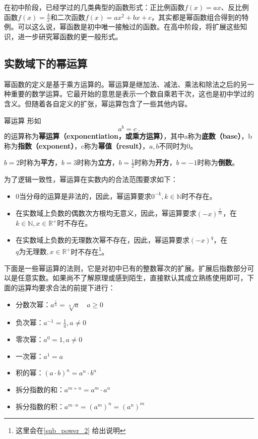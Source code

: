 


在初中阶段，已经学过的几类典型的函数形式：正比例函数$f(x) = ax$、反比例函数$\displaystyle f(x) = \frac{k}{x}$和二次函数$f(x) = ax^2+bx+c$，其实都是幂函数组合得到的特例。可以这么说，幂函数是初中唯一接触过的函数。在高中阶段，将扩展这些知识，进一步研究幂函数的更一般形式。

\subsection{实数域下的幂运算}

幂函数的定义是基于乘方运算的。幂运算是继加法、减法、乘法和除法之后的另一种重要的数学运算。它最开始的意思是表示一个数自乘若干次，这也是初中学过的含义。但随着各自定义的扩张，幂运算包含了一些其他内容。

\begin{definition}{幂运算}\label{def_power_1}
形如
\begin{equation}
a^b=c~.
\end{equation}
的运算称为\textbf{幂运算（exponentiation，或乘方运算）}，其中a称为\textbf{底数（base）}，b称为\textbf{指数（exponent）}，c称为\textbf{幂值（result）}，$a,b$不同时为$0$。

$b=2$时称为\textbf{平方}，$b=3$时称为\textbf{立方}，$\displaystyle b=\frac{1}{2}$时称为\textbf{开方}，$b=-1$时称为\textbf{倒数}。
\end{definition}

为了逻辑一致性，幂运算在实数内的合法范围要求如下：
\begin{itemize}
\item $0$当分母的运算是非法的，因此，幂运算要求$0^{-k},k\in \mathbb{N}$时不存在。
\item 在实数域上负数的偶数次方根均无意义，因此，幂运算要求$\displaystyle(-x)^\frac{1}{2k}$，在$k\in \mathbb{N},x\in\mathbb{R}^+$时不存在。
\item 在实数域上负数的无理数次幂不存在，因此，幂运算要求$\displaystyle(-x)^q$，在$q\text{为无理数},x\in\mathbb{R}^+$时不存在\footnote{这里会在\autoref{sub_power_2} 给出说明}。
\end{itemize}

下面是一些幂运算的法则，它是对初中已有的整数幂次的扩展。扩展后指数部分可以是任意实数。如果尚不了解原理或感到陌生，直接默认其成立熟练使用即可，下面的运算均要求合法的前提下进行：
\begin{itemize}
\item 分数次幂：$a^{\frac{1}{n}} = \sqrt[n]{a} \quad a \geq 0$
\item 负次幂：$\displaystyle a^{-1}=\frac{1}{a},a\neq0$
\item 零次幂：$a^0=1,a\neq0$
\item 一次幂：$a^1=a$
\item 积的幂：$(a \cdot b)^n = a^n \cdot b^n$
\item 拆分指数的和：$a^{m+n}=a^m \cdot a^n$
\item 拆分指数的积：$a^{m \cdot n}= (a^m)^n =(a^n)^m $
\end{itemize}

